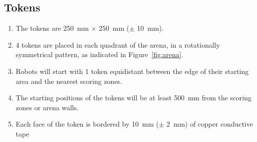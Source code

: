 \subsection{Tokens}
\label{spec:tokens}

\begin{enumerate}
  \item The tokens are \SI{250}{mm} $\times$ \SI{250}{mm} ($\pm$ \SI{10}{mm}).
  \item 4 tokens are placed in each quadrant of the arena, in a rotationally
        symmetrical pattern, as indicated in Figure~\ref{fig:arena}.
  \item Robots will start with 1 token equidistant between the edge of their
        starting area and the nearest scoring zones.
  \item The starting positions of the tokens will be at least \SI{500}{mm} from the
        scoring zones or arena walls.
  \item Each face of the token is bordered by \SI{10}{mm} ($\pm$ \SI{2}{mm}) of
        copper conductive tape
\end{enumerate}
